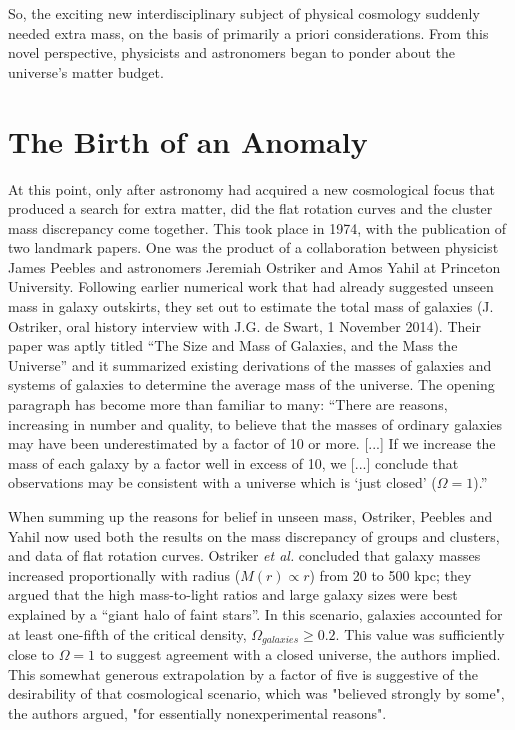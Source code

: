 \documentclass{naturefig}
\begin{document}
\noindent So, the exciting new interdisciplinary subject of physical cosmology suddenly needed extra mass, on the basis of primarily a priori considerations. From this novel perspective, physicists and astronomers began to ponder about the universe's matter budget.

\vspace{8pt}


\section*{The Birth of an Anomaly}

At this point, only after astronomy had acquired a new cosmological focus that produced a search for extra matter, did the flat rotation curves and the cluster mass discrepancy come together. This took place in 1974, with the publication of two landmark papers. One was the product of a collaboration between physicist James Peebles and astronomers Jeremiah Ostriker and Amos Yahil at Princeton University.
Following earlier numerical work that had already suggested unseen mass in galaxy outskirts,\cite{Ostriker1973} they set out to estimate the total mass of galaxies (J. Ostriker, oral history interview with J.G. de Swart, 1 November 2014). Their paper was aptly titled ``The Size and Mass of Galaxies, and the Mass the Universe'' and it summarized existing derivations of the masses of galaxies and systems of galaxies to determine the average mass of the universe. The opening paragraph has become more than familiar to many: ``There are reasons, increasing in number and quality, to believe that the masses of ordinary galaxies may have been underestimated by a factor of 10 or more. [...] If we increase the mass of each galaxy by a factor well in excess of 10, we [...] conclude that observations may be consistent with a universe which is `just closed' ($\Omega=1$).''\cite{Ostriker1974}

When summing up the reasons for belief in unseen mass, Ostriker, Peebles and Yahil now used both the results on the mass discrepancy of groups and clusters,\cite{Page1961,Field1971,Rood1972} and data of flat rotation curves.\cite{Rogstad1972,Roberts1973} Ostriker \emph{et al.} concluded that galaxy masses increased proportionally with radius ($M(r) \propto r$) from 20 to 500 kpc; they argued that the high mass-to-light ratios and large galaxy sizes were best explained by a ``giant halo of faint stars''. %
In this scenario, galaxies accounted for at least one-fifth of the critical density, $\Omega_{galaxies} \geq 0.2$. This value was sufficiently close to $\Omega=1$ to suggest agreement with a closed universe, the authors implied. This somewhat generous extrapolation by a factor of five is suggestive of the desirability of that cosmological scenario, which was "believed strongly by some", the authors argued, "for essentially nonexperimental reasons".\cite{Ostriker1974}
\end{document}
